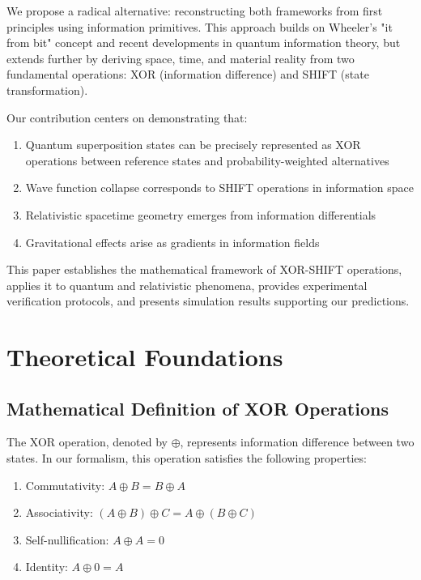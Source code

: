 \documentclass[aps,prl,preprint,superscriptaddress,showpacs]{revtex4-2}
\newcommand{\xor}{\oplus}
\begin{document}
We propose a radical alternative: reconstructing both frameworks from first principles using information primitives. This approach builds on Wheeler's "it from bit" concept and recent developments in quantum information theory, but extends further by deriving space, time, and material reality from two fundamental operations: XOR (information difference) and SHIFT (state transformation).

Our contribution centers on demonstrating that:

\begin{enumerate}
\item Quantum superposition states can be precisely represented as XOR operations between reference states and probability-weighted alternatives
\item Wave function collapse corresponds to SHIFT operations in information space
\item Relativistic spacetime geometry emerges from information differentials
\item Gravitational effects arise as gradients in information fields
\end{enumerate}

This paper establishes the mathematical framework of XOR-SHIFT operations, applies it to quantum and relativistic phenomena, provides experimental verification protocols, and presents simulation results supporting our predictions.

\section{Theoretical Foundations}

\subsection{Mathematical Definition of XOR Operations}

The XOR operation, denoted by $\xor$, represents information difference between two states. In our formalism, this operation satisfies the following properties:

\begin{enumerate}
\item Commutativity: $A \xor B = B \xor A$
\item Associativity: $(A \xor B) \xor C = A \xor (B \xor C)$
\item Self-nullification: $A \xor A = 0$
\item Identity: $A \xor 0 = A$
\end{enumerate}
\end{document}
